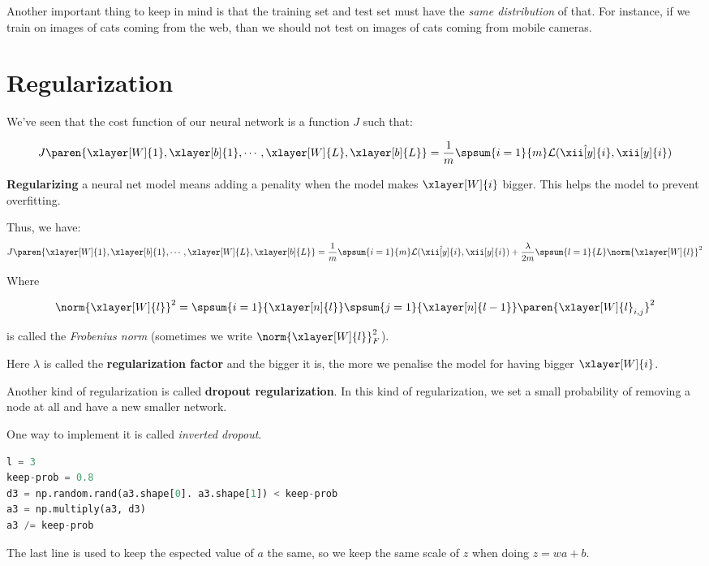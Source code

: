 \documentclass[12pt, a4paper, oneside]{book}
\begin{document}
Another important thing to keep in mind is that the training set and test set
must have the \textit{same distribution} of that. For instance, if we train on
images of cats coming from the web, than we should not test on images of cats
coming from mobile cameras.

\section{Regularization}%
\label{sec:regularization}

We've seen that the cost function of our neural network is a function $J$ such
that:

\[
    J\paren{\xlayer[W]{1},\xlayer[b]{1},\cdots,\xlayer[W]{L},\xlayer[b]{L}}=
    \dfrac{1}{m}\spsum{i=1}{m}\mathcal{L}(\hat{\xii[y]{i}},\xii[y]{i})
\]

\textbf{Regularizing} a neural net model means adding a penality when the model
makes $\xlayer[W]{i}$ bigger. This helps the model to prevent overfitting.

Thus, we have:
\[
    J\paren{\xlayer[W]{1},\xlayer[b]{1},\cdots,\xlayer[W]{L},\xlayer[b]{L}}=
    \dfrac{1}{m}\spsum{i=1}{m}\mathcal{L}(\hat{\xii[y]{i}},\xii[y]{i})
    + \dfrac{\lambda}{2m}\spsum{l=1}{L}\norm{\xlayer[W]{l}}^2
\]

Where

\[
\norm{\xlayer[W]{l}}^2=\spsum{i=1}{\xlayer[n]{l}}\spsum{j=1}{\xlayer[n]{l-1}}
\paren{\xlayer[W]{l}_{i,j}}^2
\]

is called the \textit{Frobenius norm} (sometimes we write
$\norm{\xlayer[W]{l}}^2_F$).

Here $\lambda$ is called the \textbf{regularization factor} and the bigger it
is, the more we penalise the model for having bigger $\xlayer[W]{i}$. \jump

Another kind of regularization is called \textbf{dropout regularization}. In
this kind of regularization, we set a small probability of removing a node at
all and have a new smaller network.

One way to implement it is called \textit{inverted dropout}.

\begin{lstlisting}[language=python]
l = 3
keep-prob = 0.8
d3 = np.random.rand(a3.shape[0]. a3.shape[1]) < keep-prob
a3 = np.multiply(a3, d3)
a3 /= keep-prob
\end{lstlisting}

The last line is used to keep the espected value of $a$ the same, so we keep the
same scale of $z$ when doing $z=wa+b$.
\end{document}
